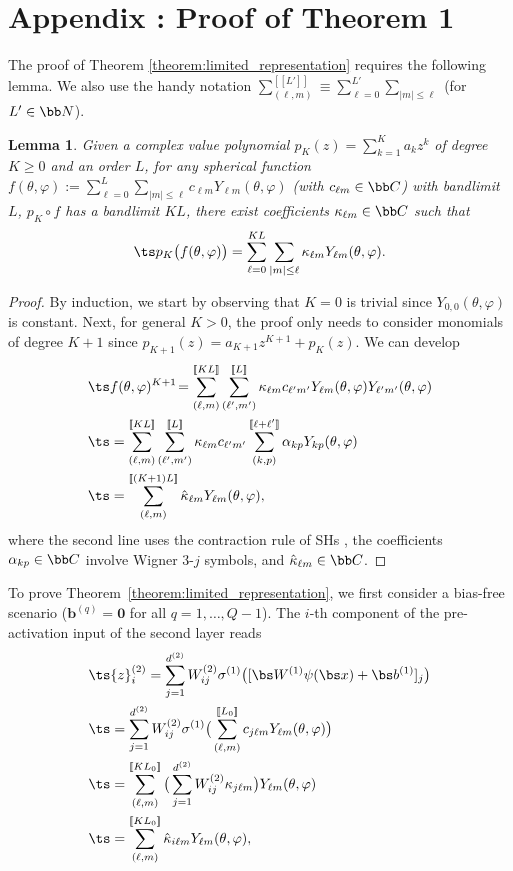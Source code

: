 \documentclass[conference]{IEEEtran}
\newtheorem{lemma}{Lemma}
\begin{document}
\section*{Appendix : Proof of Theorem 1}
\noindent
The proof of Theorem \ref{theorem:limited_representation} requires the following lemma. We also use the handy notation $\sum_{(\ell,m)}^{[\![L']\!]} \equiv \sum_{\ell=0}^{L'}\sum_{|m|\leq \ell}$ (for $L' \in \bb N$).  
\begin{lemma}
    \label{lem:1}
    Given a complex value polynomial $p_K(z) = \sum_{k=1}^{K} a_k z^k$ of degree $K\geq 0$ and an order $L$, for any spherical function $f(\theta,\varphi) := \sum_{\ell=0}^L\sum_{|m|\leq \ell} c_{\ell m} Y_{\ell m}(\theta, \varphi)$ (with $c_{\ell m} \in \bb C$) with bandlimit $L$, $p_K \circ f$ has a bandlimit $KL$, \ie there exist coefficients $\kappa_{\ell m}\in \bb C$ such that 
    $$
        \ts p_K\big(f(\theta,\varphi)\big) = \sum_{\ell=0}^{KL}\sum_{|m|\leq \ell} \kappa_{\ell m} Y_{\ell m}(\theta, \varphi). 
    $$
\end{lemma}
\vspace{-4mm}
\begin{proof}
   By induction, we start by observing that $K=0$ is trivial since $Y_{0,0}(\theta,\varphi)$ is constant. Next, for general $K>0$, the proof only needs to consider  monomials of degree ${K+1}$ since $p_{K+1}(z) = a_{K+1} z^{K+1} + p_K(z)$. We can develop  
   \begin{align*}
   &\ts f(\theta, \varphi)^{K+1}\!= \sum_{(\ell,m)}^{[\![KL]\!]} \sum_{(\ell',m')}^{[\![L]\!]} \kappa_{\ell m} c_{\ell' m'} Y_{\ell m}(\theta,\varphi) Y_{\ell' m'}(\theta,\varphi)\\
   &\ts = \sum_{(\ell,m)}^{[\![KL]\!]} \sum_{(\ell',m')}^{[\![L]\!]}\kappa_{\ell m} c_{\ell' m'} \sum_{(k,p)}^{[\![\ell + \ell']\!]} \alpha_{kp} Y_{k p}(\theta, \varphi) \\
   &\ts = \sum_{(\ell, m)}^{[\![(K+1)L]\!]} {\hat \kappa}_{\ell m}  Y_{\ell m}(\theta, \varphi), 
    \end{align*}
    where the second line uses the contraction rule of SHs \cite[Sec.~5.8]{devanathan_angular_2002}, the coefficients $\alpha_{kp}\in \bb C$ involve Wigner 3-$j$ symbols, and $\hat \kappa_{\ell m} \in \bb C$.
\end{proof}
To prove Theorem~\ref{theorem:limited_representation}, we first consider a bias-free scenario ($\mathbf{b}^{(q)} = \mathbf{0}$ for all $q = 1, \dots, Q-1$). 
The $i$-th component of the pre-activation input of the second layer reads
   \begin{align*}
       &\ts {z}_i^{(2)} = 
        \sum_{j=1}^{d^{(2)}} W^{(2)}_{ij} \sigma^{(1)} \big([\bs W^{(1)} \psi(\bs x) + \bs b^{(1)}]_j\big) \\
       & \ts = \sum_{j=1}^{d^{(2)}} W^{(2)}_{ij} \sigma^{(1)}\big( \sum_{(\ell,m)}^{[\![L_0]\!]} c_{j \ell m} Y_{\ell m}(\theta,\varphi)\big) \\
       &\ts = \sum_{(\ell,m)}^{[\![KL_0]\!]} \big(\sum_{j=1}^{d^{(2)}} W^{(2)}_{ij}\kappa_{j\ell m}\big) Y_{\ell m}(\theta, \varphi)\\
       &\ts = \sum_{(\ell,m)}^{[\![KL_0]\!]} \hat \kappa_{i\ell m} Y_{\ell m}(\theta, \varphi), 
   \end{align*}
\end{document}
